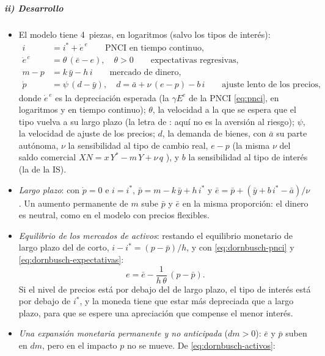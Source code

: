 \documentclass[11pt]{article}
\begin{document}
\subparagraph{ii) Desarrollo}
\begin{itemize}
\item El modelo tiene 4~piezas, en logaritmos (salvo los tipos de interés):
  \begin{align}
  i&=i^{*}+\dot e^{\,e}\qquad\text{PNCI en tiempo continuo,}\label{eq:dornbusch-pnci}\\
  \dot e^{\,e}&=\theta\,(\bar e-e),\quad \theta>0\qquad\text{expectativas regresivas,}\label{eq:dornbusch-expectativas}\\
  m-p&=k\,\bar y-h\,i\qquad\text{mercado de dinero,}\label{eq:dornbusch-dinero}\\
  \dot p&=\psi\,(d-\bar y),\quad d=\bar a+\nu\,(e-p)-b\,i\qquad\text{ajuste lento de los precios,}\label{eq:dornbusch-precios}
  \end{align}
  donde $\dot e^{\,e}$ es la depreciación esperada (la $\gamma E^e$ de la PNCI \eqref{eq:pnci}, en logaritmos y en tiempo continuo); $\theta$, la velocidad a la que se espera que el tipo vuelva a su largo plazo (la letra de : aquí no es la aversión al riesgo); $\psi$, la velocidad de ajuste de los precios; $d$, la demanda de bienes, con $\bar a$ su parte autónoma, $\nu$ la sensibilidad al tipo de cambio real, $e-p$ (la misma $\nu$ del saldo comercial $XN=x\,Y^{*}-m\,Y+\nu\,q$ ), y $b$ la sensibilidad al tipo de interés (la de la IS).
\item \emph{Largo plazo}: con $\dot p=0$ e $i=i^*$, $\bar p=m-k\,\bar y+h\,i^*$ y $\bar e=\bar p+(\bar y+b\,i^*-\bar a)/\nu$. Un aumento permanente de $m$ sube $\bar p$ y $\bar e$ en la misma proporción: el dinero es neutral, como en el modelo con precios flexibles.
\item \emph{Equilibrio de los mercados de activos}: restando el equilibrio monetario de largo plazo del de corto, $i-i^*=(p-\bar p)/h$, y con \eqref{eq:dornbusch-pnci} y \eqref{eq:dornbusch-expectativas}:
  \begin{equation}\label{eq:dornbusch-activos}
  e=\bar e-\frac{1}{h\,\theta}\,(p-\bar p) .
  \end{equation}
  Si el nivel de precios está por debajo del de largo plazo, el tipo de interés está por debajo de $i^*$, y la moneda tiene que estar más depreciada que a largo plazo, para que se espere una apreciación que compense el menor interés.
\item \emph{Una expansión monetaria permanente y no anticipada} ($dm>0$): $\bar e$ y $\bar p$ suben en $dm$, pero en el impacto $p$ no se mueve. De \eqref{eq:dornbusch-activos}:

\end{itemize}
\end{document}
